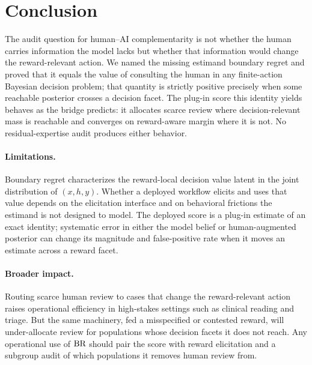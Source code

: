 \section{Conclusion}
\label{sec:conclusion}

The audit question for human--AI complementarity is not whether the human carries information the model lacks but whether that information would change the reward-relevant action.
We named the missing estimand boundary regret and proved that it equals the value of consulting the human in any finite-action Bayesian decision problem; that quantity is strictly positive precisely when some reachable posterior crosses a decision facet.
The plug-in score this identity yields behaves as the bridge predicts: it allocates scarce review where decision-relevant mass is reachable and converges on reward-aware margin where it is not.
No residual-expertise audit produces either behavior.

\paragraph{Limitations.}
Boundary regret characterizes the reward-local decision value latent in the joint distribution of $(x, h, y)$.
Whether a deployed workflow elicits and uses that value depends on the elicitation interface and on behavioral frictions \citep{Vaccaro2024,BucinaEtAl2021} the estimand is not designed to model.
The deployed score is a plug-in estimate of an exact identity; systematic error in either the model belief or human-augmented posterior can change its magnitude and false-positive rate when it moves an estimate across a reward facet.

\paragraph{Broader impact.}
Routing scarce human review to cases that change the reward-relevant action raises operational efficiency in high-stakes settings such as clinical reading and triage.
But the same machinery, fed a misspecified or contested reward, will under-allocate review for populations whose decision facets it does not reach.
Any operational use of $\operatorname{BR}$ should pair the score with reward elicitation and a subgroup audit of which populations it removes human review from.

